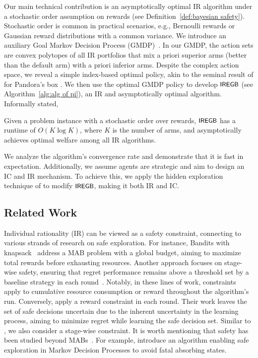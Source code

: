 Our main technical contribution is an asymptotically optimal IR algorithm under a stochastic order assumption on rewards (see Definition~\ref{def:bayesian safety}).  Stochastic order is common in practical scenarios, e.g., Bernoulli rewards or Gaussian reward distributions with a common variance. We introduce an auxiliary Goal Markov Decision Process (GMDP)~\cite{barto1995learning}. In our GMDP, the action sets are convex polytopes of all IR portfolios that mix a priori superior arms (better than the default arm) with a priori inferior arms. Despite the complex action space, we reveal a simple index-based optimal policy, akin to the seminal result of \citet{weitzman1978optimal} for Pandora's box \cite{gergatsouli2024weitzman, atsidakou2024contextual,boodaghians2020pandora, berger2023pandora}. We then use the optimal GMDP policy to develop ${\small\textnormal{\textsf{IREGB}}}$ (see Algorithm~\ref{alg:alg of pi}), an IR and asymptotically optimal algorithm. Informally stated,
\begin{theorem}
Given a problem instance with a stochastic order over rewards, ${\small\textnormal{\textsf{IREGB}}}$ has a runtime of $O(K \log K)$, where $K$ is the number of arms, and asymptotically achieves optimal welfare among all IR algorithms.
\end{theorem}
We analyze the algorithm's convergence rate and demonstrate that it is fast in expectation. Additionally, we assume agents are strategic and aim to design an IC and IR mechanism. To achieve this, we apply the hidden exploration technique of \citet{mansour2015bayesian} to modify ${\small\textnormal{\textsf{IREGB}}}$, making it both IR and IC.

\subsection{Related Work}\label{subsec:related}
Individual rationality (IR) can be viewed as a safety constraint, connecting to various strands of research on safe exploration. For instance, Bandits with knapsack~\cite{badanidiyuru2013bandits} address a MAB problem with a global budget, aiming to maximize total rewards before exhausting resources. Another approach focuses on stage-wise safety, ensuring that regret performance remains above a threshold set by a baseline strategy in each round~\cite{kazerouni2017conservative,wu2016conservative}. Notably, in these lines of work, constraints apply to cumulative resource consumption or reward throughout the algorithm's run. Conversely, \citet{amani2019linear} apply a reward constraint in each round. Their work leaves the set of safe decisions uncertain due to the inherent uncertainty in the learning process, aiming to minimize regret while learning the safe decision set. Similar to \citet{amani2019linear}, we also consider a stage-wise constraint. It is worth mentioning that safety has been studied beyond MABs~\cite{wachi2020safe,Moldovan:2012}. For example, \citet{Moldovan:2012} introduce  an algorithm enabling safe exploration in Markov Decision Processes to avoid fatal absorbing states. 

